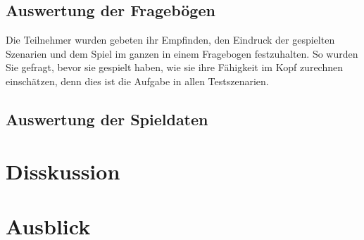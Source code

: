 \section{Auswertung der Fragebögen}
Die Teilnehmer wurden gebeten ihr Empfinden, den Eindruck der gespielten Szenarien und dem Spiel im ganzen in einem Fragebogen festzuhalten. So wurden Sie gefragt, bevor sie gespielt haben, wie sie ihre Fähigkeit im Kopf zurechnen einschätzen, denn dies ist die Aufgabe in allen Testszenarien. 
\newline

\section{Auswertung der Spieldaten}
\chapter{Disskussion}
\chapter{Ausblick}


\listoffigures
%


